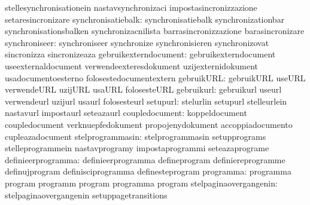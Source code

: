                                   stellesynchronisationein         nastavsynchronizaci
                                  impostasincronizzazione          setaresincronizare
              synchronisatiebalk: synchronisatiebalk               synchronizationbar
                                  synchronisationsbalken           synchronizacnilista
                                  barrasincronizzazione            barasincronizare
                   synchroniseer: synchroniseer                    synchronize
                                  synchronisieren                  synchronizovat
                                  sincronizza                      sincronizeaza
           gebruikexterndocument: gebruikexterndocument            useexternaldocument
                                  verwendeexteresdokument          uzijexternidokument
                                  usadocumentoesterno              folosestedocumentextern
                      gebruikURL: gebruikURL                       useURL
                                  verwendeURL                      uzijURL
                                  usaURL                           folosesteURL
                      gebruikurl: gebruikurl                       useurl
                                  verwendeurl                      uzijurl
                                  usaurl                           folosesteurl
                        setupurl: stelurlin                        setupurl
                                  stelleurlein                     nastavurl
                                  impostaurl                       seteazaurl
                  coupledocument: koppeldocument                   coupledocument
                                  verknuepfedokument               propojenydokument
                                  accoppiadocumento                cupleazadocument
                stelprogrammasin: stelprogrammasin                 setupprograms
                                  stelleprogrammein                nastavprogramy
                                  impostaprogrammi                 seteazaprograme
              definieerprogramma: definieerprogramma               defineprogram
                                  definiereprogramme               definujprogram
                                  definisciprogramma               definesteprogram
                       programma: programma                        program
                                  programm                         program
                                  programma                        program
          stelpaginaovergangenin: stelpaginaovergangenin           setuppagetransitions
